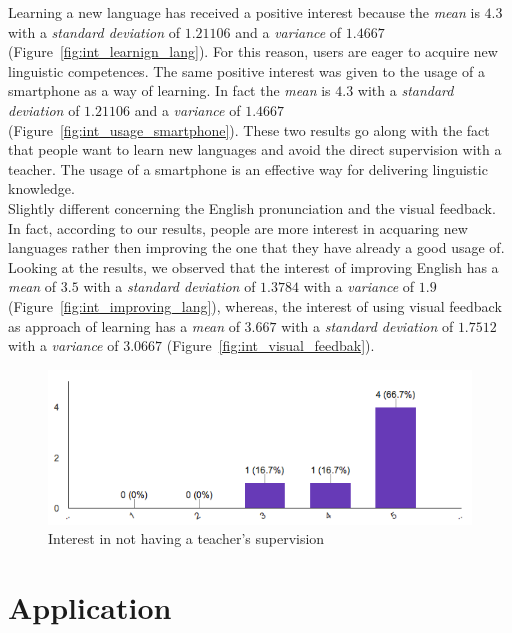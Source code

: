 \noindent Learning a new language has received a positive interest because the \textit{mean} is $4.3$ with a \textit{standard deviation} of $1.21106$ and a \textit{variance} of $1.4667$ (Figure~\ref{fig:int_learnign_lang}). For this reason, users are eager to acquire new linguistic competences. The same positive interest was given to the usage of a smartphone as a way of learning. In fact the \textit{mean} is $4.3$ with a \textit{standard deviation} of $1.21106$ and a \textit{variance} of $1.4667$ (Figure~\ref{fig:int_usage_smartphone}). These two results go along with the fact that people want to learn new languages and avoid the direct supervision with a teacher. The usage of a smartphone is an effective way for delivering linguistic knowledge. \\

\noindent Slightly different concerning the English pronunciation and the visual feedback. In fact, according to our results, people are more interest in acquaring new languages rather then improving the one that they have already a good usage of. Looking at the results, we observed that the interest of improving English has a \textit{mean} of $3.5$ with a \textit{standard deviation} of $1.3784$ with a \textit{variance} of $1.9$ (Figure~\ref{fig:int_improving_lang}), whereas, the interest of using visual feedback as approach of learning has a \textit{mean} of $3.667$ with a \textit{standard deviation} of $1.7512$ with a \textit{variance} of $3.0667$ (Figure~\ref{fig:int_visual_feedbak}).

\begin{figure}[!ht]
	\centering
	\includegraphics[scale=0.4]{Figures/responses/interest_no_teacher.png}
	\caption{Interest in not having a teacher's supervision}
	\label{fig:int_no_teacher}
\end{figure}

\section{Application}
\label{sub:Application}


